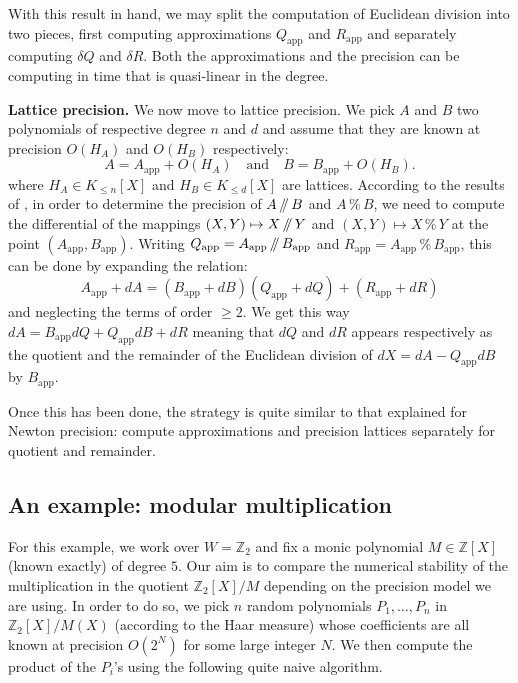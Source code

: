 \documentclass{sig-alternate-05-2015}
\newcommand{\Z}{\mathbb Z}
\renewcommand{\mod}{\,\%\,}
\renewcommand{\div}{\,/\hspace{-0.3em}/\,}
\newcommand{\app}{\textrm{app}}
\begin{document}
With this result in hand, we may split the computation of
Euclidean division into two pieces, first computing approximations
$Q_\app$ and $R_\app$ and separately computing $\delta Q$ and $\delta R$.
Both the approximations and the precision can be computing in time that is
quasi-linear in the degree. 

\medskip

\noindent
{\bf Lattice precision.}
We now move to lattice precision. We pick $A$ and $B$ two polynomials 
of respective degree $n$ and $d$ and assume that they are known at 
precision $O(H_A)$ and $O(H_B)$ respectively:
$$A = A_\app + O(H_A)
\quad \text{and} \quad
B = B_\app + O(H_B).$$
where $H_A \in K_{\leq n}[X]$ and $H_B \in K_{\leq d}[X]$ are lattices. 
According to the results of \cite{caruso-roe-vaccon:14a}, in order to determine the 
precision of $A \div B$ and $A \mod B$, we need to compute the 
differential of the mappings $(X,Y) \mapsto X \div Y$ and $(X,Y)
\mapsto X \mod Y$ at the point $(A_\app, B_\app)$. Writing $Q_\app = A_\app \div
B_\app$ and $R_\app = A_\app \mod B_\app$, this can be done by
expanding the relation:
$$A_\app + dA = (B_\app + dB) (Q_\app + dQ) + (R_\app + dR)$$
and neglecting the terms of order $\geq 2$. We get this way 
$dA = B_\app dQ + Q_\app dB + dR$
meaning that $dQ$ and $dR$ appears respectively as the quotient and
the remainder of the Euclidean division of $dX = dA - Q_\app dB$ by $B_\app$.

Once this has been done, the strategy is quite similar to that explained 
for Newton precision: compute approximations and precision lattices
separately for quotient and remainder.

\subsection{An example: modular multiplication}

For this example, we work over $W = \Z_2$ and fix a monic polynomial $M 
\in \Z[X]$ (known exactly) of degree $5$. Our aim is to compare the 
numerical stability of the multiplication in the quotient $\Z_2[X]/M$ 
depending on the precision model we are using. In order to do so, we 
pick $n$ random polynomials $P_1, \ldots, P_n$ in $\Z_2[X]/M(X)$ 
(according to the Haar measure) whose coefficients are all known at 
precision $O(2^N)$ for some large integer $N$. We then compute the 
product of the $P_i$'s using the following quite naive algorithm.

\noindent\hrulefill
\end{document}
